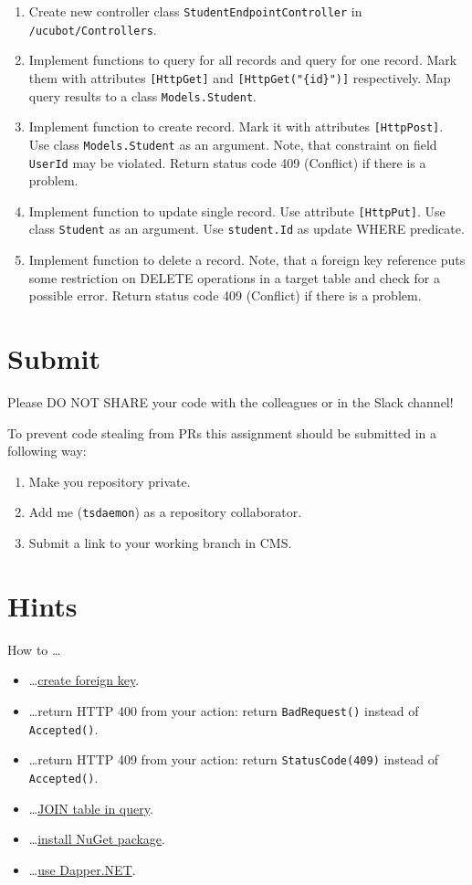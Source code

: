 \documentclass[12pt]{article}
\newcommand{\code}[1]{\texttt{#1}}
\begin{document}
\begin{enumerate}
\item Create new controller class \code{StudentEndpointController} in \code{/ucubot/Controllers}.
\item Implement functions to query for all records and query for one record. Mark them with attributes \code{[HttpGet]} and \code{[HttpGet("\{id\}")]} respectively. Map query results to a class \code{Models.Student}.
\item Implement function to create record. Mark it with attributes \code{[HttpPost]}. Use class \code{Models.Student} as an argument. Note, that constraint on field \code{UserId} may be violated. Return status code 409 (Conflict) if there is a problem.
\item Implement function to update single record. Use attribute \code{[HttpPut]}. Use class \code{Student} as an argument. Use \code{student.Id} as update WHERE predicate.
\item Implement function to delete a record. Note, that a foreign key reference puts some restriction on DELETE operations in a target table and check for a possible error. Return status code 409 (Conflict) if there is a problem.
\end{enumerate}

\section*{Submit}

Please DO NOT SHARE your code with the colleagues or in the Slack channel!

To prevent code stealing from PRs this assignment should be submitted in a following way:
\begin{enumerate}
\item Make you repository private.
\item Add me (\code{tsdaemon}) as a repository collaborator.
\item Submit a link to your working branch in CMS.
\end{enumerate}

\clearpage

\section*{Hints}
How to \dots
\begin{itemize}
\item \dots \href{https://dev.mysql.com/doc/refman/5.6/en/create-table-foreign-keys.html}{create foreign key}.
\item \dots return HTTP 400 from your action: return \code{BadRequest()} instead of \code{Accepted()}.
\item \dots return HTTP 409 from your action: return \code{StatusCode(409)} instead of \code{Accepted()}.
\item \dots \href{https://dev.mysql.com/doc/refman/5.7/en/join.html}{JOIN table in query}.
\item \dots \href{https://www.jetbrains.com/help/rider/Using_NuGet.html}{install NuGet package}.
\item \dots \href{https://github.com/StackExchange/Dapper}{use Dapper.NET}.
\end{itemize}
\end{document}
